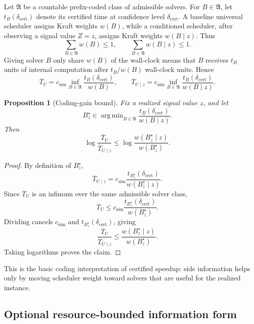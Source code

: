 \documentclass{article}
\newtheorem{proposition}{Proposition}
\DeclareMathOperator*{\argmin}{arg\,min}
\begin{document}
Let \(\mathfrak A\) be a countable prefix-coded class of admissible solvers.  For
\(B\in\mathfrak A\), let \(t_B(\delta_{\mathrm{cert}})\) denote its certified time at
confidence level \(\delta_{\mathrm{cert}}\).  A baseline universal scheduler assigns Kraft
weights \(w(B)\), while a conditioned scheduler, after observing a signal value \(Z=z\),
assigns Kraft weights \(w(B\mid z)\).  Thus
\[
    \sum_{B\in\mathfrak A}w(B)\le 1,
    \qquad
    \sum_{B\in\mathfrak A}w(B\mid z)\le 1.
\]
Giving solver \(B\) only share \(w(B)\) of the wall-clock means that \(B\) receives
\(t_B\) units of internal computation after \(t_B/w(B)\) wall-clock units.  Hence
\[
    \overline T_U
    =
    c_{\mathrm{sim}}
    \inf_{B\in\mathfrak A}
    \frac{t_B(\delta_{\mathrm{cert}})}{w(B)},
    \qquad
    \overline T_{U\mid z}
    =
    c_{\mathrm{sim}}
    \inf_{B\in\mathfrak A}
    \frac{t_B(\delta_{\mathrm{cert}})}{w(B\mid z)}.
\]

\begin{proposition}[Coding-gain bound]
\label{prop:app-coding-gain}
Fix a realized signal value \(z\), and let
\[
    B_z^\star
    \in
    \argmin_{B\in\mathfrak A}
    \frac{t_B(\delta_{\mathrm{cert}})}{w(B\mid z)}.
\]
Then
\[
    \log\frac{\overline T_U}{\overline T_{U\mid z}}
    \le
    \log\frac{w(B_z^\star\mid z)}{w(B_z^\star)}.
\]
\end{proposition}

\begin{proof}
By definition of \(B_z^\star\),
\[
    \overline T_{U\mid z}
    =
    c_{\mathrm{sim}}
    \frac{t_{B_z^\star}(\delta_{\mathrm{cert}})}
         {w(B_z^\star\mid z)}.
\]
Since \(\overline T_U\) is an infimum over the same admissible solver class,
\[
    \overline T_U
    \le
    c_{\mathrm{sim}}
    \frac{t_{B_z^\star}(\delta_{\mathrm{cert}})}
         {w(B_z^\star)}.
\]
Dividing cancels \(c_{\mathrm{sim}}\) and \(t_{B_z^\star}(\delta_{\mathrm{cert}})\), giving
\[
    \frac{\overline T_U}{\overline T_{U\mid z}}
    \le
    \frac{w(B_z^\star\mid z)}{w(B_z^\star)}.
\]
Taking logarithms proves the claim.
\end{proof}

This is the basic coding interpretation of certified speedup: side information helps only
by moving scheduler weight toward solvers that are useful for the realized instance.

\subsection{Optional resource-bounded information form}
\end{document}
